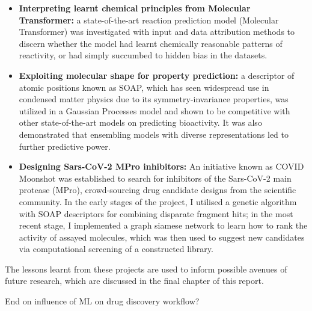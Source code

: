 \begin{itemize}
    \item \textbf{Interpreting learnt chemical principles from Molecular Transformer:} a state-of-the-art reaction prediction model (Molecular Transformer) was investigated with input and data attribution methods to discern whether the model had learnt chemically reasonable patterns of reactivity, or had simply succumbed to hidden bias in the datasets.
    \item \textbf{Exploiting molecular shape for property prediction:} a descriptor of atomic positions known as SOAP, which has seen widespread use in condensed matter physics due to its symmetry-invariance properties, was utilized in a Gaussian Processes model and shown to be competitive with other state-of-the-art models on predicting bioactivity. It was also demonstrated that ensembling models with diverse representations led to further predictive power.
    \item \textbf{Designing Sars-CoV-2 MPro inhibitors:} An initiative known as COVID Moonshot \cite{moonshot2020} was established to search for inhibitors of the Sars-CoV-2 main protease (MPro), crowd-sourcing drug candidate designs from the scientific community. In the early stages of the project, I utilised a genetic algorithm with SOAP descriptors for combining disparate fragment hits; in the most recent stage, I implemented a graph siamese network to learn how to rank the activity of assayed molecules, which was then used to suggest new candidates via computational screening of a constructed library.
\end{itemize}
The lessons learnt from these projects are used to inform possible avenues of future research, which are discussed in the final chapter of this report.

End on influence of ML on drug discovery workflow?

